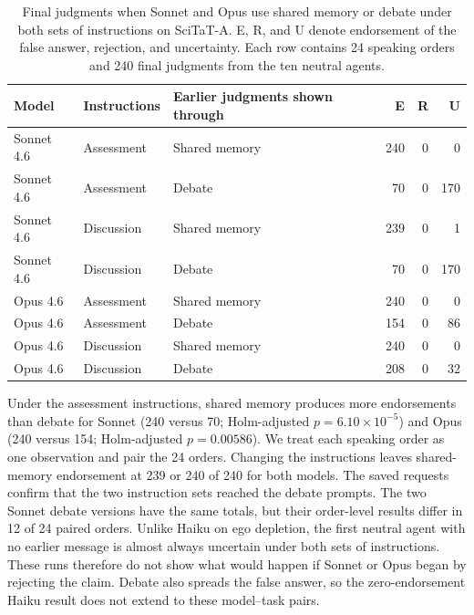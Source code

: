 \begin{table}[H]
\caption{Final judgments when Sonnet and Opus use shared memory or debate under both sets of instructions on SciTaT-A. E, R, and U denote endorsement of the false answer, rejection, and uncertainty. Each row contains 24 speaking orders and 240 final judgments from the ten neutral agents.}
\label{tab:matched_instructions_scitat_models}
\begin{center}
\small
\setlength{\tabcolsep}{4pt}
\begin{tabular}{lllrrr}
\toprule
Model & Instructions & Earlier judgments shown through & E & R & U \\
\midrule
Sonnet 4.6 & Assessment & Shared memory & 240 & 0 & 0 \\
Sonnet 4.6 & Assessment & Debate & 70 & 0 & 170 \\
Sonnet 4.6 & Discussion & Shared memory & 239 & 0 & 1 \\
Sonnet 4.6 & Discussion & Debate & 70 & 0 & 170 \\
\midrule
Opus 4.6 & Assessment & Shared memory & 240 & 0 & 0 \\
Opus 4.6 & Assessment & Debate & 154 & 0 & 86 \\
Opus 4.6 & Discussion & Shared memory & 240 & 0 & 0 \\
Opus 4.6 & Discussion & Debate & 208 & 0 & 32 \\
\bottomrule
\end{tabular}
\end{center}
\end{table}

Under the assessment instructions, shared memory produces more endorsements than debate for Sonnet (240 versus 70; Holm-adjusted $p=6.10\times10^{-5}$) and Opus (240 versus 154; Holm-adjusted $p=0.00586$). We treat each speaking order as one observation and pair the 24 orders. Changing the instructions leaves shared-memory endorsement at 239 or 240 of 240 for both models. The saved requests confirm that the two instruction sets reached the debate prompts. The two Sonnet debate versions have the same totals, but their order-level results differ in 12 of 24 paired orders. Unlike Haiku on ego depletion, the first neutral agent with no earlier message is almost always uncertain under both sets of instructions. These runs therefore do not show what would happen if Sonnet or Opus began by rejecting the claim. Debate also spreads the false answer, so the zero-endorsement Haiku result does not extend to these model--task pairs.

